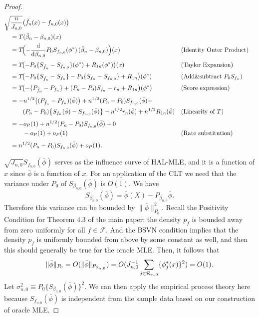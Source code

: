 \begin{proof}

\begin{align*}
&\sqrt{\frac{n}{J_{n,0}}}\bigl(\tilde f_n(x) - f_{n,0}(x)\bigr) \\
&\quad= T(\tilde \beta_n - \beta_{n,0})(x) \\
&\quad= T\!\Bigl(
      -\frac{\mathrm{d}}{\mathrm{d}\beta_{n,0}}
      P_0 S_{f_{n,0}}(\phi^{\ast})
      \,( \tilde \beta_n - \beta_{n,0})
    \Bigr)(x) &&\text{(Identity Outer Product)} \\[2pt]
&\quad= T\!\bigl(
        - P_0\{S_{\tilde f_n}-S_{f_{n,0}}\}(\phi^{\ast})
        + R_{1n}(\phi^{\ast})\bigr)(x) &&\text{(Taylor Expansion)} \\[2pt]
&\quad= T\!\bigl(
        -P_0\{S_{\tilde f_n}-S_{f_n}\}
        - P_0\{S_{f_n}-S_{f_{n,0}}\}
        + R_{1n}
      \bigr)(\phi^{\ast}) &&\text{(Add\&subtract $P_0 S_{f_n}$)} \\[2pt]
&\quad= T\!\bigl(
        -\{P_{\tilde f_n}-P_{f_n}\}
        + (P_n-P_0)S_{f_n}
        - r_n + R_{1n}
      \bigr)(\phi^{\ast}) &&\text{(Score expression)} \\[3pt]
&\quad= -n^{1/2}\bigl((P_{\tilde f_n} - P_{f_n})(\bar\phi)\bigr) + n^{1/2}(P_n-P_0)S_{f_{n,0}}(\bar\phi) +  \\
&\qquad\quad (P_n-P_0)\bigl\{S_{f_n}(\bar\phi)-S_{f_{n,0}}(\bar\phi)\bigr\} - n^{1/2}r_n(\bar\phi)
     + n^{1/2}R_{1n}(\bar\phi) &&\text{(Linearity of $T$)} \\[3pt]
&\quad= - o_P(1)
     + n^{1/2}(P_n-P_0)S_{f_{n,0}}(\bar\phi) + 0\\
&\qquad\quad - o_P(1) + o_P(1) &&\text{(Rate substitution)} \\[3pt]
&\quad = n^{1/2}(P_n-P_0)S_{f_{n,0}}(\bar\phi) + o_P(1).
\end{align*}

$\sqrt{J_{n,0}}S_{f_{n,0}}(\bar\phi)$ serves as the influence curve of HAL-MLE, and it is a function of $x$ since $\bar\phi$ is a function of $x$. For an application of the CLT we need that the variance under $P_0$ of $S_{\beta_{n,0}}(\bar{\phi})$ is $O(1)$. We have \[S_{\beta_{n,0}}(\bar{\phi})=\bar{\phi}(X)-P_{\beta_{n,0}}\bar{\phi}.\] Therefore this variance can be bounded by $\| \bar{\phi}\|_{P_0}^2$. 
Recall the Positivity Condition for Theorem 4.3 of the main paper: the density $p_f$ is bounded away from zero uniformly for all $f \in \mathcal F$. And the BSVN condition implies that the density $p_f$ is uniformly bounded from above by some constant as well, and then this should generally be true for the oracle MLE. Then, it follows that 
\[
\| \bar{\phi}\|_{P_0}=O(\| \bar{\phi}\|_{P_{\beta_{n,0}} } )=O( J_{n,0}^{-1}\sum_{j\in {\cal R}_{n,0}}\{\phi_j^*(x)\}^2)=O(1).
\]
Let $\sigma^2_{n,0}\equiv P_0 \{S_{\beta_{n,0}}(\bar{\phi})\}^2$. We can then apply the empirical process theory here because $S_{f_{n,0}}(\bar\phi)$ is independent from the sample data based on our construction of oracle MLE.


\end{proof}
